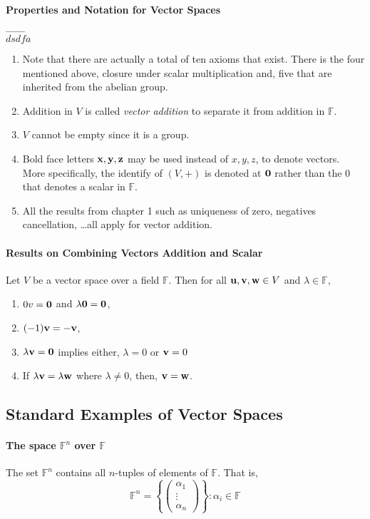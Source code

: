\paragraph{Properties and Notation for Vector Spaces}
\(\vec{dsdfa}\)
\begin{enumerate}
    \item Note that there are actually a total of ten axioms that exist.
    There is the four mentioned above, closure under scalar multiplication
    and, five that are inherited from the abelian group.
    \item Addition in \(V\) is called \textit{vector addition}
    to separate it from addition in \(\mathbb{F}\).
    \item \(V\) cannot be empty since it is a group.
    \item Bold face letters \(\mathbf{x}, \mathbf{y}, \mathbf{z}\) may be used instead of \(x, y, z\),
    to denote vectors. More specifically, the identify of \((V, +)\)
    is denoted at \(\mathbf{0}\) rather than the \( 0 \)
    that denotes a scalar in \(\mathbb{F}\).
    \item All the results from chapter 1 such as uniqueness of zero,
    negatives cancellation, \dots all apply for vector addition.
\end{enumerate}

\paragraph{Results on Combining Vectors Addition and Scalar}
Let \(V\) be a vector space over a field \(\mathbb{F}\).
Then for all \(\mathbf{u}, \mathbf{v},\mathbf{w} \in V\) and \(\lambda \in \mathbb{F}\),
\begin{enumerate}
    \item \(0 v = \mathbf{0} \) and \(\lambda \mathbf{0} = \mathbf{0}\),
    \item \((-1)\mathbf{v} = -\mathbf{v}\),
    \item \(\lambda\mathbf{v} = \mathbf{0} \) implies either,
    \(\lambda = 0\) or \(\mathbf{v} = 0\)
    \item If \(\lambda\mathbf{v} = \lambda\mathbf{w}\) where \(\lambda\neq 0\),
    then, \(\mathbf{v} = \mathbf{w}\).
\end{enumerate}

\subsection{Standard Examples of Vector Spaces}

\paragraph{The space \(\mathbb{F}^n\) over \(\mathbb{F}\)}
The set \(\mathbb{F}^n\) contains all \(n\)-tuples of elements of
\(\mathbb{F}\).
That is,
\[
    \mathbb{F}^n =
    \left\{ 
        \begin{pmatrix}
            \alpha_1 \\ \vdots \\ \alpha_n
        \end{pmatrix}
    \right\}
    :
    \alpha_i \in \mathbb{F}
\]

